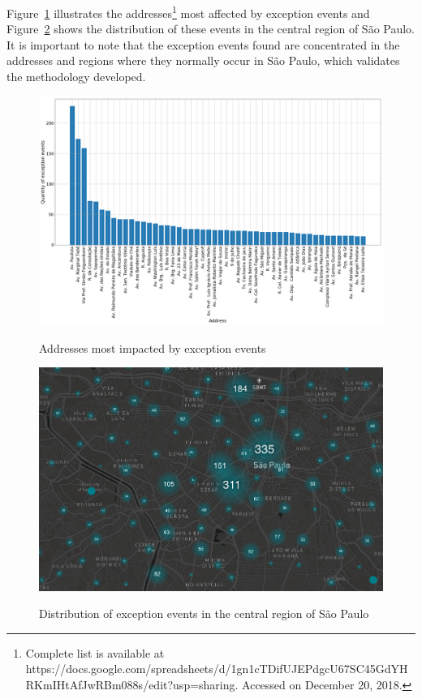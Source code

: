 \documentclass[runningheads]{llncs}
\begin{document}
Figure~\ref{fig:address_analysis} illustrates the addresses\footnote{Complete list is available at https://docs.google.com/spreadsheets/d/\newline1gn1cTDifUJEPdgcU67SC45GdYHRKmIHtAfJwRBm088s/edit?usp=sharing. Accessed on December 20, 2018.} most affected by exception events and Figure~\ref{fig:dispersion} shows the distribution of these events in the central region of São Paulo. It is important to note that the exception events found are concentrated in the addresses and regions where they normally occur in São Paulo, which validates the methodology developed.

\begin{figure}[!htb]
	\centering
 	  \caption{Addresses most impacted by exception events}
		\includegraphics[width=0.80\linewidth]{address_analysis.png}
	\label{fig:address_analysis}
\end{figure}

\begin{figure}[!htb]
	\centering
 	  \caption{Distribution of exception events in the central region of São Paulo}
		\includegraphics[width=0.80\linewidth]{exception_events_sp.png}
	\label{fig:dispersion}
\end{figure}
\end{document}
